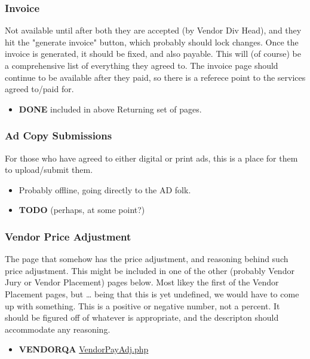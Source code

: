 \documentclass[captions=tablesignature]{scrartcl}
\begin{document}
\subsubsection{Invoice}
\label{sec-3-1-8}
Not available until after both they are accepted (by Vendor
Div Head), and they hit the "generate invoice" button, which
probably should lock changes.  Once the invoice is generated, it
should be fixed, and also payable.
This will (of course) be a comprehensive list of everything they
agreed to.  The invoice page should continue to be available after
they paid, so there is a referece point to the services agreed
to/paid for.
\begin{itemize}
\item {\bfseries\sffamily DONE} included in above Returning set of pages.
\label{sec-3-1-8-1}
\end{itemize}

\subsubsection{Ad Copy Submissions}
\label{sec-3-1-9}
For those who have agreed to either digital or print ads, this is
a place for them to upload/submit them.
\begin{itemize}
\item Probably offline, going directly to the AD folk.
\end{itemize}
\begin{itemize}
\item {\bfseries\sffamily TODO} (perhaps, at some point?)
\label{sec-3-1-9-1}
\end{itemize}

\subsubsection{Vendor Price Adjustment}
\label{sec-3-1-10}
The page that somehow has the price adjustment, and reasoning
behind such price adjustment.
This might be included in one of the other (probably Vendor Jury
or Vendor Placement) pages below.  Most likey the first of the
Vendor Placement pages, but \ldots{} being that this is yet undefined,
we would have to come up with something.
This is a positive or negative number, not a percent.  It should
be figured off of whatever is appropriate, and the descripton
should accommodate any reasoning.
\begin{itemize}
\item {\bfseries\sffamily VENDORQA} \href{../webpages/VendorPayAdj.php}{VendorPayAdj.php}
\label{sec-3-1-10-1}
\end{itemize}
\end{document}

